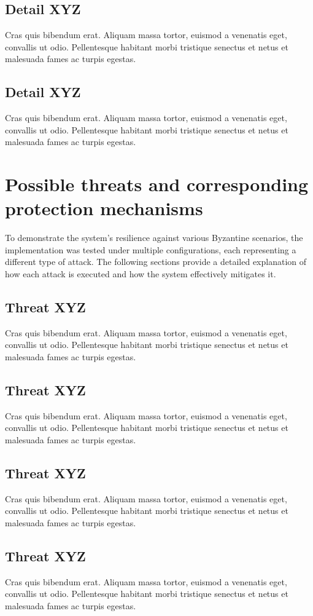 \documentclass[runningheads]{llncs}
\begin{document}
\subsection{Detail XYZ}
Cras quis bibendum erat. Aliquam massa tortor, euismod a venenatis eget,
convallis ut odio. Pellentesque habitant morbi tristique senectus et netus et
malesuada fames ac turpis egestas.
%
\subsection{Detail XYZ}
Cras quis bibendum erat. Aliquam massa tortor, euismod a venenatis eget,
convallis ut odio. Pellentesque habitant morbi tristique senectus et netus et
malesuada fames ac turpis egestas.
%
\section{Possible threats and corresponding protection mechanisms} To
demonstrate the system's resilience against various Byzantine scenarios, the
implementation was tested under multiple configurations, each representing a
different type of attack. The following sections provide a detailed explanation
of how each attack is executed and how the system effectively mitigates it.
\subsection{Threat XYZ}
Cras quis bibendum erat. Aliquam massa tortor, euismod a venenatis eget,
convallis ut odio. Pellentesque habitant morbi tristique senectus et netus et
malesuada fames ac turpis egestas.
%
\subsection{Threat XYZ}
Cras quis bibendum erat. Aliquam massa tortor, euismod a venenatis eget,
convallis ut odio. Pellentesque habitant morbi tristique senectus et netus et
malesuada fames ac turpis egestas.
%
\subsection{Threat XYZ}
Cras quis bibendum erat. Aliquam massa tortor, euismod a venenatis eget,
convallis ut odio. Pellentesque habitant morbi tristique senectus et netus et
malesuada fames ac turpis egestas.
%
\subsection{Threat XYZ}
Cras quis bibendum erat. Aliquam massa tortor, euismod a venenatis eget,
convallis ut odio. Pellentesque habitant morbi tristique senectus et netus et
malesuada fames ac turpis egestas.
%
\end{document}
